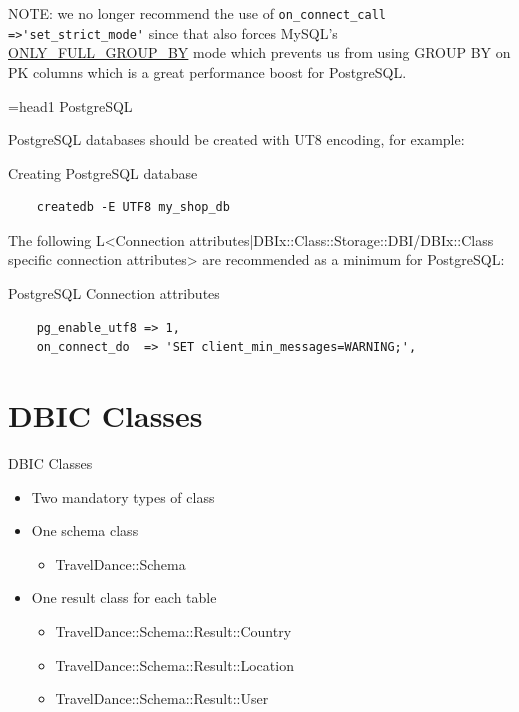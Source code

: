 NOTE: we no longer recommend the use of 
\verb|on_connect_call =>'set_strict_mode'| since that also forces MySQL's 
\href{https://dev.mysql.com/doc/refman/5.0/en/sql-mode.html#sqlmode\_only\_full\_group\_by}{ONLY\_FULL\_GROUP\_BY} mode which prevents us from using GROUP BY on PK columns which is a great performance boost for PostgreSQL.

=head1 PostgreSQL

PostgreSQL databases should be created with UT8 encoding, for example:

\begin{frame}[fragile]{Creating PostgreSQL database}
\begin{lstlisting}
    createdb -E UTF8 my_shop_db
\end{lstlisting}
\end{frame}

The following L<Connection attributes|DBIx::Class::Storage::DBI/DBIx::Class specific connection attributes> are recommended as a minimum for PostgreSQL:

\begin{frame}[fragile]{PostgreSQL Connection attributes}
\begin{lstlisting}
    pg_enable_utf8 => 1,
    on_connect_do  => 'SET client_min_messages=WARNING;',
\end{lstlisting}
\end{frame}

\section{DBIC Classes}

\begin{frame}{DBIC Classes}
\begin{itemize}
\item Two mandatory types of class
\item One schema class
\begin{itemize}
\item TravelDance::Schema
\end{itemize}
\item One result class for each table
\begin{itemize}
\item TravelDance::Schema::Result::Country
\item TravelDance::Schema::Result::Location
\item TravelDance::Schema::Result::User
\end{itemize}
\end{itemize}
\end{frame}

